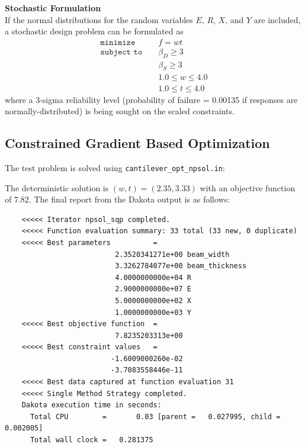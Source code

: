 {\bf Stochastic Formulation } \\
If the normal distributions for the random variables $E$, $R$, $X$,
and $Y$ are included, a stochastic design problem can be formulated as
\begin{eqnarray}
\texttt{minimize }   & & f = w t            \nonumber\\
\texttt{subject to } & & \beta_{D} \geq 3   \label{additional:cantouu}\\
                     & & \beta_{S} \geq 3   \nonumber\\
                     & & 1.0 \leq w \leq 4.0\nonumber\\
                     & & 1.0 \leq t \leq 4.0\nonumber
\end{eqnarray}
where a 3-sigma reliability level (probability of failure = 0.00135 if
responses are normally-distributed) is being sought on the scaled
constraints.

\subsection{Constrained Gradient Based Optimization}
The test problem is solved using {\tt cantilever\_opt\_npsol.in}:
\begin{center}
  \begin{small}
    \begin{bigbox}
    \end{bigbox}
  \end{small}
  \label{additional:cant_opt_npsol}
\end{center}

The deterministic solution is $(w,t)=(2.35,3.33)$ with an objective
function of $7.82$. The final report from the Dakota output is as
follows:
\begin{small}
\begin{verbatim}
    <<<<< Iterator npsol_sqp completed.
    <<<<< Function evaluation summary: 33 total (33 new, 0 duplicate)
    <<<<< Best parameters          =
                          2.3520341271e+00 beam_width
                          3.3262784077e+00 beam_thickness
                          4.0000000000e+04 R
                          2.9000000000e+07 E
                          5.0000000000e+02 X
                          1.0000000000e+03 Y
    <<<<< Best objective function  =
                          7.8235203313e+00
    <<<<< Best constraint values   =
                         -1.6009000260e-02
                         -3.7083558446e-11
    <<<<< Best data captured at function evaluation 31
    <<<<< Single Method Strategy completed.
    Dakota execution time in seconds:
      Total CPU        =       0.03 [parent =   0.027995, child =   0.002005]
      Total wall clock =   0.281375
\end{verbatim}
\end{small}

